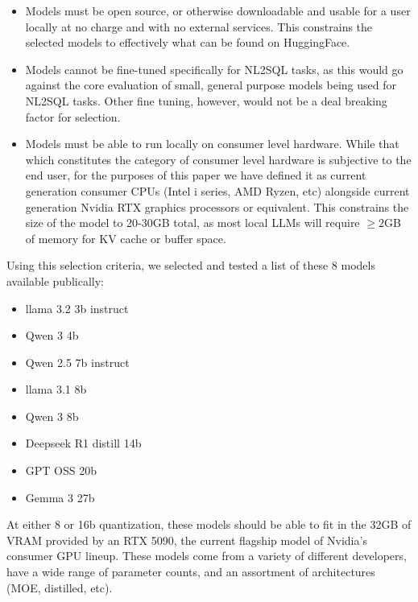 \documentclass[sigconf]{acmart}
\begin{document}
\begin{itemize}
  \item Models must be open source, or otherwise downloadable and usable for a user locally at no charge and with no 
  external services. This constrains the selected models to effectively what can be found on HuggingFace.
  \item Models cannot be fine-tuned specifically for NL2SQL tasks, as this would go 
  against the core evaluation of small, general purpose models being used for NL2SQL tasks. Other fine tuning, however,
  would not be a deal breaking factor for selection.
  \item Models must be able to run locally on consumer level hardware. While that which constitutes the category of 
  consumer level hardware is subjective to the end user, for the purposes of this paper we have defined it as current
  generation consumer CPUs (Intel i series, AMD Ryzen, etc) alongside current generation Nvidia RTX graphics processors
  or equivalent. This constrains the size of the model to 20-30GB total, as most local LLMs will require $\geq 2$GB of 
  memory for KV cache or buffer space.
\end{itemize}

Using this selection criteria, we selected and tested a list of these 8 models available publically:

\begin{itemize}
  \item llama 3.2 3b instruct \cite{llama32_3b_citation}
  \item Qwen 3 4b \cite{qwen3_4b_citation}
  \item Qwen 2.5 7b instruct \cite{qwen25_7b_citation}
  \item llama 3.1 8b \cite{llama31_8b_citation}
  \item Qwen 3 8b \cite{qwen3_8b_citation}
  \item Deepseek R1 distill 14b \cite{deepseek_r1_citation}
  \item GPT OSS 20b \cite{gpt_oss_20b_citation}
  \item Gemma 3 27b \cite{gemma3_27b_citation}
\end{itemize}

At either 8 or 16b quantization, these models should be able to fit in the 32GB of VRAM provided by an RTX 5090, the 
current flagship model of Nvidia's consumer GPU lineup. These models come from a variety of different developers, have 
a wide range of parameter counts, and an assortment of architectures (MOE, distilled, etc).
\end{document}
